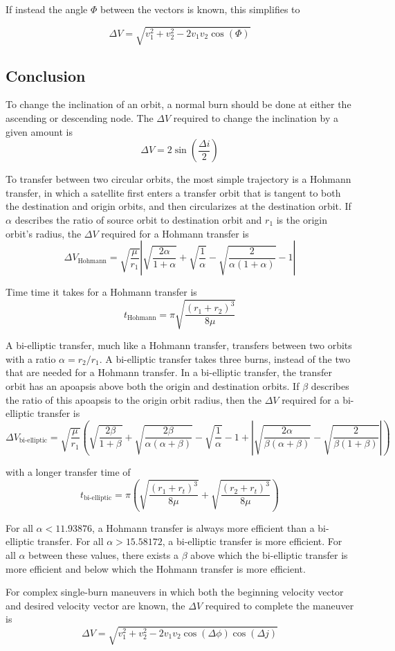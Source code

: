 \documentclass[../main.tex]{subfiles}
\begin{document}
If instead the angle $\varPhi$ between the vectors is known, this simplifies to

\begin{equation}
    \Delta V = \sqrt{v_1^2+v_2^2-2v_1v_2\cos(\varPhi)}
\end{equation}

\bigskip\bigskip
\subsection{Conclusion}

\bigskip
To change the inclination of an orbit, a normal burn should be done at either the ascending or descending node. The $\Delta V$ required to change the inclination by a given amount is
$$\Delta V=2\sin\left(\frac{\Delta i}{2}\right)$$

\bigskip
To transfer between two circular orbits, the most simple trajectory is a Hohmann transfer, in which a satellite first enters a transfer orbit that is tangent to both the destination and origin orbits, and then circularizes at the destination orbit. If $\alpha$ describes the ratio of source orbit to destination orbit and $r_1$ is the origin orbit's radius, the $\Delta V$ required for a Hohmann transfer is
$$\Delta V_\text{Hohmann} = \sqrt{\frac{\mu}{r_1}}\left|\sqrt{\frac{2\alpha}{1+\alpha}}+\sqrt{\frac{1}{\alpha}}-\sqrt{\frac{2}{\alpha(1+\alpha)}}-1\right|$$

Time time it takes for a Hohmann transfer is
$$t_\text{Hohmann}=\pi\sqrt{\frac{(r_1+r_2)^3}{8\mu}}$$

\bigskip
A bi-elliptic transfer, much like a Hohmann transfer, transfers between two orbits with a ratio $\alpha=r_2/r_1$. A bi-elliptic transfer takes three burns, instead of the two that are needed for a Hohmann transfer. In a bi-elliptic transfer, the transfer orbit has an apoapsis above both the origin and destination orbits. If $\beta$ describes the ratio of this apoapsis to the origin orbit radius, then the $\Delta V$ required for a bi-elliptic transfer is
$$\Delta V_\text{bi-elliptic} = \sqrt{\frac{\mu}{r_1}}\left(\sqrt{\frac{2\beta}{1+\beta}}+\sqrt{\frac{2\beta}{\alpha(\alpha+\beta)}}-\sqrt{\frac{1}{\alpha}}-1+\left|\sqrt{\frac{2\alpha}{\beta(\alpha+\beta)}}-\sqrt{\frac{2}{\beta(1+\beta)}}\right|\right)$$

with a longer transfer time of
$$t_\text{bi-elliptic}=\pi\left(\sqrt{\frac{(r_1+r_t)^3}{8\mu}}+\sqrt{\frac{(r_2+r_t)^3}{8\mu}}\right)$$

For all $\alpha<11.93876$, a Hohmann transfer is always more efficient than a bi-elliptic transfer. For all $\alpha>15.58172$, a bi-elliptic transfer is more efficient. For all $\alpha$ between these values, there exists a $\beta$ above which the bi-elliptic transfer is more efficient and below which the Hohmann transfer is more efficient.

\bigskip

For complex single-burn maneuvers in which both the beginning velocity vector and desired velocity vector are known, the $\Delta V$ required to complete the maneuver is
$$\Delta V = \sqrt{v_1^2+v_2^2-2v_1v_2\cos(\Delta \phi)\cos(\Delta j)}$$
\end{document}
